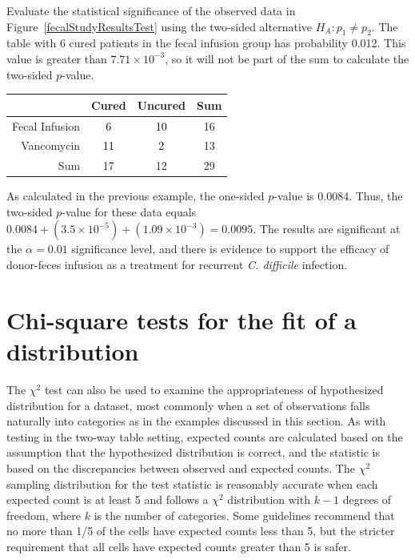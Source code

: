 \begin{examplewrap}
\begin{nexample}{Evaluate the statistical significance of the observed data in Figure~\ref{fecalStudyResultsTest} using the two-sided alternative $H_A: p_1 \neq p_2$.}
The table with 6 cured patients in the fecal infusion group has probability 0.012. This value is greater than $7.71 \times 10^{-3}$, so it will not be part of the sum to calculate the two-sided $p$-value.

\begin{center}
	\color{gray}
	\begin{tabular}{r|cc|c}
		\hline
		& Cured & Uncured & Sum \\
		\hline
		Fecal Infusion & \textcolor{black}{6} & \textcolor{black}{10} & 16 \\
		Vancomycin & \textcolor{black}{11} & \textcolor{black}{2} & 13 \\
		\hline
		Sum & 17 & 12 & 29 \\
		\hline
	\end{tabular}
\end{center}

As calculated in the previous example, the one-sided $p$-value is $0.0084$. Thus, the two-sided $p$-value for these data equals $0.0084 + (3.5 \times 10^{-5}) + (1.09 \times 10^{-3}) = 0.0095$. The results are significant at the $\alpha = 0.01$ significance level, and there is evidence to support the efficacy of donor-feces infusion as a treatment for recurrent \textit{C. difficile} infection.
\end{nexample}
\end{examplewrap}



\section[Chi-square tests for the fit of a distribution]{Chi-square tests for the fit of a distribution}
\label{oneWayChiSquare}

The $\chi^2$ test can also be used to examine the appropriateness of hypothesized distribution for a dataset, most commonly when a set of observations falls naturally into categories as in the examples discussed in this section. As with testing in the two-way table setting, expected counts are calculated based on the assumption that the hypothesized distribution is correct, and the statistic is based on the discrepancies between observed and expected counts. The  $\chi^2$ sampling distribution for the test statistic is reasonably accurate when each expected count is at least 5 and follows a $\chi^2$ distribution with $k-1$ degrees of freedom, where $k$ is the number of categories.  Some guidelines recommend that no more than 1/5 of the cells have expected counts less than 5, but the stricter requirement that all cells have expected counts greater than 5 is safer.

